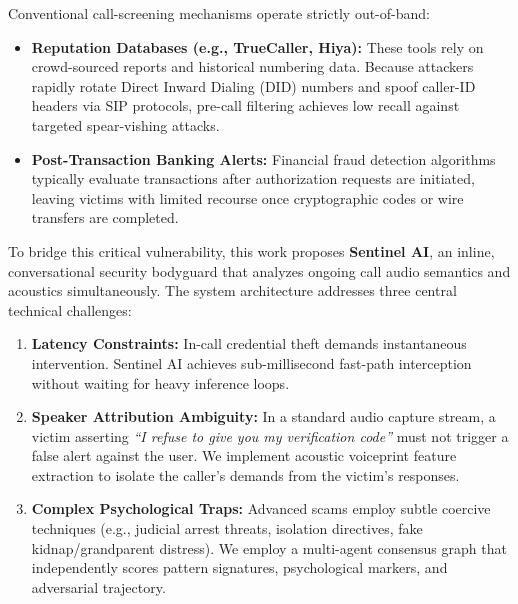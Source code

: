 \documentclass[conference]{IEEEtran}
\begin{document}
Conventional call-screening mechanisms operate strictly out-of-band:
\begin{itemize}
    \item \textbf{Reputation Databases (e.g., TrueCaller, Hiya):} These tools rely on crowd-sourced reports and historical numbering data. Because attackers rapidly rotate Direct Inward Dialing (DID) numbers and spoof caller-ID headers via SIP protocols, pre-call filtering achieves low recall against targeted spear-vishing attacks.
    \item \textbf{Post-Transaction Banking Alerts:} Financial fraud detection algorithms typically evaluate transactions after authorization requests are initiated, leaving victims with limited recourse once cryptographic codes or wire transfers are completed.
\end{itemize}

To bridge this critical vulnerability, this work proposes \textbf{Sentinel AI}, an inline, conversational security bodyguard that analyzes ongoing call audio semantics and acoustics simultaneously. The system architecture addresses three central technical challenges:
\begin{enumerate}
    \item \textbf{Latency Constraints:} In-call credential theft demands instantaneous intervention. Sentinel AI achieves sub-millisecond fast-path interception without waiting for heavy inference loops.
    \item \textbf{Speaker Attribution Ambiguity:} In a standard audio capture stream, a victim asserting \textit{``I refuse to give you my verification code''} must not trigger a false alert against the user. We implement acoustic voiceprint feature extraction to isolate the caller's demands from the victim's responses.
    \item \textbf{Complex Psychological Traps:} Advanced scams employ subtle coercive techniques (e.g., judicial arrest threats, isolation directives, fake kidnap/grandparent distress). We employ a multi-agent consensus graph that independently scores pattern signatures, psychological markers, and adversarial trajectory.
\end{enumerate}
\end{document}
